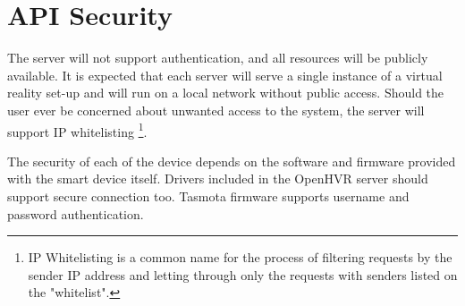 \hypertarget{x-api-security}{\section{API Security}}
The server will not support authentication, and all resources will be publicly
available. It is expected that each server will serve a single instance of
a virtual reality set-up and will run on a local network without public access.
Should the user ever be concerned about unwanted access to the system, the server
will support IP whitelisting
\footnote{IP Whitelisting is a common name for the process of filtering requests by the sender IP address and letting through only the requests with senders listed on the "whitelist".}.


The security of each of the device depends on the software and firmware provided
with the smart device itself. Drivers included in the OpenHVR server should
support secure connection too. Tasmota firmware supports username and
password authentication.
